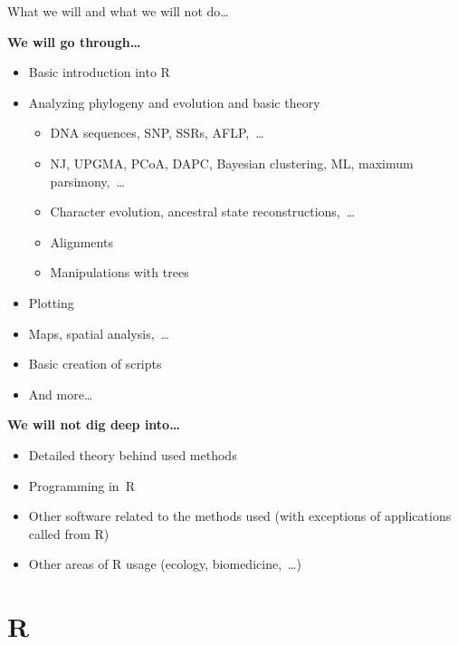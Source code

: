 \documentclass[compress, ucs, xelatex, 11pt, xcolor=svgnames,
  hyperref={
    bookmarks=true,
    unicode=true,
    colorlinks=true,
    pdftitle={Molecular data in R},
    plainpages=false,
    pdfauthor={Vojtech Zeisek},
    pdfsubject={Course about phylogeny and evolution in R},
    pdfcreator={XeLaTeX},
    pdfkeywords={R, evolution, phylogeny, molecular data},
    linkcolor=Tomato,
    anchorcolor=SaddleBrown,
    citecolor=Goldenrod,
    filecolor=DarkMagenta,
    menucolor=Sienna,
    urlcolor=DarkTurquoise,
    pdftex},
  url={hyphens, lowtilde} %
  ]{beamer}
\begin{document}
\begin{frame}{What we will and what we will not do\ldots}
  \begin{multicols}{2}
    \textbf{We will go through\ldots}
    \begin{itemize}
      \item Basic introduction into R
      \item Analyzing phylogeny and evolution and basic theory
      \begin{itemize}
	\item DNA sequences, SNP, SSRs, AFLP,~\ldots
	\item NJ, UPGMA, PCoA, DAPC, Bayesian clustering, ML, maximum parsimony,~\ldots
	\item Character evolution, ancestral state reconstructions,~\ldots
	\item Alignments
	\item Manipulations with trees
      \end{itemize}
      \item Plotting
    \columnbreak
      \item Maps, spatial analysis,~\ldots
      \item Basic creation of scripts
      \item And more\ldots
    \end{itemize}
    \textbf{We will not dig deep into\ldots}
    \begin{itemize}
      \item Detailed theory behind used methods
      \item Programming in~R
      \item Other software related to the methods used (with exceptions of applications called from R)
      \item Other areas of R usage (ecology, biomedicine,~\ldots)
    \end{itemize}
  \end{multicols}
\end{frame}

\section{R}
\end{document}

